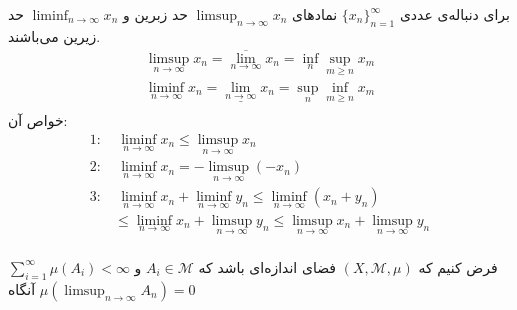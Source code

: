 \begin{recall}
برای دنباله‌ی عددی 
$ \lbrace x_n \rbrace_{n = 1}^{\infty} $
نمادهای 
$ \limsup_{n \rightarrow \infty} x_n $
حد زبرین و
$ \liminf_{n \rightarrow \infty} x_n $
حد زیرین می‌باشند.
\begin{equation*}
\begin{split}
\limsup_{n \rightarrow \infty} x_n = \overline{\lim_{n \rightarrow \infty}} x_n = \inf_{n} \sup_{m \geq n} x_m \\
\liminf_{n \rightarrow \infty} x_n = \underline{\lim_{n \rightarrow \infty}} x_n = \sup_{n} \inf_{m \geq n} x_m \\
\end{split}
\end{equation*}
خواص آن:
\begin{equation*}
\begin{split}
1 :& \ \liminf_{n \rightarrow \infty} x_n \leq \limsup_{n \rightarrow \infty} x_n \\
2 :& \ \liminf_{n \rightarrow \infty} x_n =  - \limsup_{n \rightarrow \infty} (- x_n) \\
3 :& \ \liminf_{n \rightarrow \infty} x_n + \liminf_{n \rightarrow \infty} y_n \leq \liminf_{n \rightarrow \infty} (x_n + y_n) \\
    &\leq \liminf_{n \rightarrow \infty} x_n + \limsup_{n \rightarrow \infty} y_n \leq \limsup_{n \rightarrow \infty} x_n + \limsup_{n \rightarrow \infty} y_n  \\
\end{split}
\end{equation*}
\end{recall}

\begin{lemma}
فرض کنیم که 
$ (X, \mathcal{M}, \mu) $
فضای اندازه‌ای باشد که 
$ A_i \in \mathcal{M} $
و
$ \sum_{i = 1}^{\infty} \mu(A_i) < \infty $
آنگاه 
$ \mu(\limsup_{n \rightarrow \infty} A_n) = 0 $
\end{lemma}